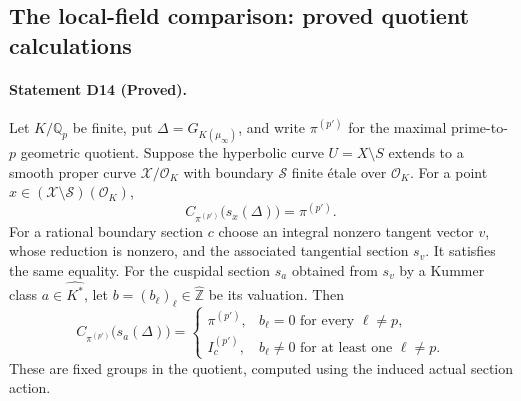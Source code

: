 \subsection{The local-field comparison: proved quotient calculations}

\paragraph{Statement D14 (Proved).}\label{res:D14}
Let $K/\mathbb Q_p$ be finite, put
$\Delta=G_{K(\mu_\infty)}$, and write $\pi^{(p')}$ for the maximal
prime-to-$p$ geometric quotient.  Suppose the hyperbolic curve
$U=X\setminus S$ extends to
a smooth proper curve $\mathscr X/\mathcal O_K$ with boundary
$\mathscr S$ finite \'etale over $\mathcal O_K$.
For a point $x\in(\mathscr X\setminus\mathscr S)(\mathcal O_K)$,
\[
       C_{\pi^{(p')}}\bigl(s_x(\Delta)\bigr)=\pi^{(p')}.
\]
For a rational boundary section $c$ choose an integral nonzero tangent
vector $v$, whose reduction is nonzero, and the associated tangential
section $s_v$.  It satisfies the same equality.  For the cuspidal
section $s_a$ obtained from $s_v$ by a Kummer class
$a\in\widehat{K^*}$, let
$b=(b_\ell)_\ell\in\widehat{\mathbb Z}$ be its valuation.  Then
\[
 C_{\pi^{(p')}}\bigl(s_a(\Delta)\bigr)=
 \begin{cases}
       \pi^{(p')},& b_\ell=0\text{ for every }\ell\ne p,\\
       I_c^{(p')},& b_\ell\ne0\text{ for at least one }\ell\ne p.
 \end{cases}                                                   \tag{E.4}
\]
These are fixed groups in the quotient, computed using the induced
actual section action.

